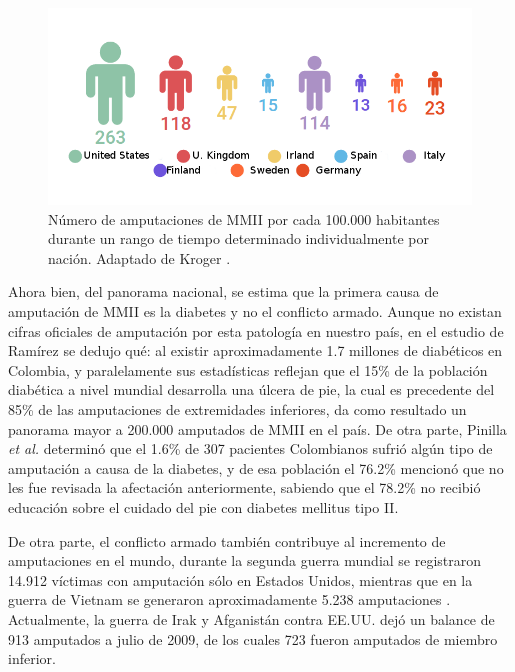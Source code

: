 \documentclass[12pt,english]{article}
\begin{document}
\begin{figure}[H]
\begin{centering}
\includegraphics[scale=0.5]{ampperyear}
\par\end{centering}

\caption{\label{fig:N=0000FAmero-de-amputaciones}Número de amputaciones de
MMII por cada 100.000 habitantes durante un rango de tiempo determinado
individualmente por nación. Adaptado de Kroger \cite{KrogerKnut2015}. }


\end{figure}


Ahora bien, del panorama nacional, se estima que la primera causa
de amputación de MMII es la diabetes y no el conflicto armado. Aunque
no existan cifras oficiales de amputación por esta patología en nuestro
país, en el estudio de Ramírez \cite{Ramirez2014} se dedujo qué:
al existir aproximadamente 1.7 millones de diabéticos en Colombia,
y paralelamente sus estadísticas reflejan que el 15\% de la población
diabética a nivel mundial desarrolla una úlcera de pie, la cual es
precedente del 85\% de las amputaciones de extremidades inferiores,
da como resultado un panorama mayor a 200.000 amputados de MMII en
el país. De otra parte, Pinilla \emph{et al.} \cite{Pinilla2011}
determinó que el 1.6\% de 307 pacientes Colombianos sufrió algún tipo
de amputación a causa de la diabetes, y de esa población el 76.2\%
mencionó que no les fue revisada la afectación anteriormente,  sabiendo
que el 78.2\% no recibió educación sobre el cuidado del pie con diabetes
mellitus tipo II.

De otra parte, el conflicto armado también contribuye al incremento
de amputaciones en el mundo, durante la segunda guerra mundial se
registraron 14.912 víctimas con amputación sólo en Estados Unidos,
mientras que en la guerra de Vietnam se generaron aproximadamente
5.238 amputaciones \cite{Laferrier2010a}. Actualmente, la guerra
de Irak y Afganistán contra EE.UU. dejó un balance de 913 amputados
a julio de 2009, de los cuales 723 fueron amputados de miembro inferior\cite{Fergason2010}. 
\end{document}
